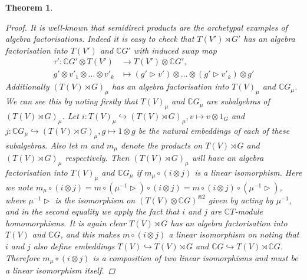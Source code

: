 \documentclass[10pt]{article}
\newcommand{\bb}{\medbreak}
\newcommand{\nt}{\noindent}
\newcommand{\Cc }{\mathbb{C}}
\newcommand{\rt}{\xrightarrow{}}
\newtheorem{theorem}[lemma]{Theorem}
\theoremstyle{definition}
\begin{document}
\begin{theorem}
\begin{proof}
\nt It is well-known that semidirect products are the archetypal examples of algebra factorisations. Indeed it is easy to check that $T(V')\rtimes G'$ has an algebra factorisation into $T(V')$ and $\Cc G'$ with induced swap map 
\begin{align}\label{tau'}
  \tau':\Cc G'\otimes T(V') & \rt T(V')\otimes \Cc G',\\ 
  g'\otimes v'_1\otimes \dots \otimes v'_k  & \mapsto (g'\rhd v')\otimes\dots \otimes (g'\rhd v'_k) \otimes g'\nonumber
\end{align}
Additionally $(T(V)\rtimes G)_\mu$ has an algebra factorisation into $T(V)_\mu$ and $\Cc G_\mu$. We can see this by noting firstly that $T(V)_\mu$ and $\Cc G_\mu$ are subalgebras of $(T(V)\rtimes G)_\mu$. Let $i:T(V)_\mu\hookrightarrow (T(V)\rtimes G)_\mu, v\mapsto v\otimes 1_G$ and $j:\Cc G_\mu\hookrightarrow (T(V)\rtimes G)_\mu, g\mapsto 1\otimes g$ be the natural embeddings of each of these subalgebras. Also let $m$ and $m_\mu$ denote the products on $T(V)\rtimes G$ and $(T(V)\rtimes G)_\mu$ respectively. Then $(T(V)\rtimes G)_\mu$ will have an algebra factorisation into $T(V)_\mu$ and $\Cc G_\mu$ if $m_\mu\circ (i\otimes j)$ is a linear isomorphism. Here we note $m_\mu\circ (i\otimes j)=m\circ (\mu^{-1}\rhd )\circ (i\otimes j)=m\circ (i\otimes j)\circ (\mu^{-1}\rhd )$, where $\mu^{-1}\rhd$ is the isomorphism on $(T(V)\otimes \Cc G)^{\otimes 2}$ given by acting by $\mu^{-1}$, and in the second equality we apply the fact that $i$ and $j$ are $\Cc T$-module homomorphisms. It is again clear $T(V)\rtimes G$ has an algebra factorisation into $T(V)$ and $\Cc G$, and this makes $m\circ (i\otimes j)$ a linear isomorphism on noting that $i$ and $j$ also define embeddings $T(V)\hookrightarrow T(V)\rtimes G$ and $\Cc G\hookrightarrow T(V)\rtimes \Cc G$. Therefore $m_\mu\circ (i\otimes j)$ is a composition of two linear isomorphisms and must be a linear isomorphism itself.\bb


\end{proof}
\end{theorem}
\end{document}
